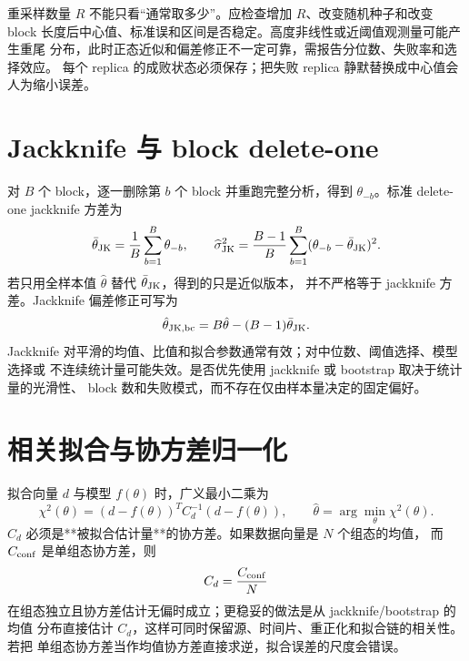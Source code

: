 重采样数量 \(R\) 不能只看“通常取多少”。应检查增加 \(R\)、改变随机种子和改变
block 长度后中心值、标准误和区间是否稳定。高度非线性或近阈值观测量可能产生重尾
分布，此时正态近似和偏差修正不一定可靠，需报告分位数、失败率和选择效应。
每个 replica 的成败状态必须保存；把失败 replica 静默替换成中心值会人为缩小误差。

\section{Jackknife 与 block delete-one}

对 \(B\) 个 block，逐一删除第 \(b\) 个 block 并重跑完整分析，得到
\(\theta_{-b}\)。标准 delete-one jackknife 方差为
\begin{equation}
  \bar\theta_{\rm JK}=\frac1B\sum_{b=1}^B\theta_{-b},
  \qquad
  \widehat\sigma_{\rm JK}^2
  =\frac{B-1}{B}\sum_{b=1}^B
  (\theta_{-b}-\bar\theta_{\rm JK})^2 .
  \label{eq:b03-jackknife}
\end{equation}
若只用全样本值 \(\hat\theta\) 替代 \(\bar\theta_{\rm JK}\)，得到的只是近似版本，
并不严格等于 jackknife 方差。Jackknife 偏差修正可写为
\begin{equation}
  \hat\theta_{\rm JK,bc}=B\hat\theta-(B-1)\bar\theta_{\rm JK}.
  \label{eq:b03-jackknife-bias}
\end{equation}
Jackknife 对平滑的均值、比值和拟合参数通常有效；对中位数、阈值选择、模型选择或
不连续统计量可能失效。是否优先使用 jackknife 或 bootstrap 取决于统计量的光滑性、
block 数和失败模式，而不存在仅由样本量决定的固定偏好。

\section{相关拟合与协方差归一化}

拟合向量 \(d\) 与模型 \(f(\theta)\) 时，广义最小二乘为
\begin{equation}
  \chi^2(\theta)=(d-f(\theta))^TC_d^{-1}(d-f(\theta)),
  \qquad
  \hat\theta=\arg\min_\theta\chi^2(\theta).
  \label{eq:b03-gls}
\end{equation}
\(C_d\) 必须是**被拟合估计量**的协方差。如果数据向量是 \(N\) 个组态的均值，
而 \(C_{\rm conf}\) 是单组态协方差，则
\begin{equation}
  C_d=\frac{C_{\rm conf}}{N}
  \label{eq:b03-covariance-of-mean}
\end{equation}
在组态独立且协方差估计无偏时成立；更稳妥的做法是从 jackknife/bootstrap 的均值
分布直接估计 \(C_d\)，这样可同时保留源、时间片、重正化和拟合链的相关性。若把
单组态协方差当作均值协方差直接求逆，拟合误差的尺度会错误。

